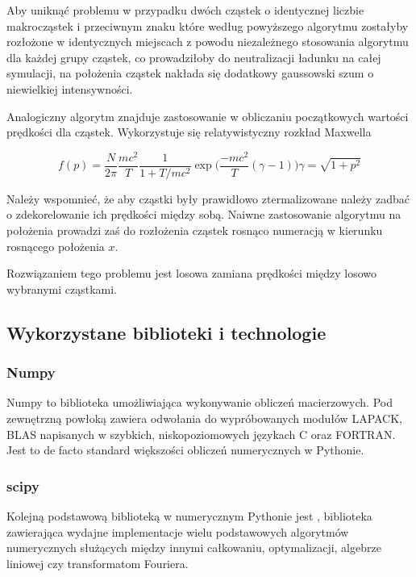     Aby uniknąć problemu w przypadku dwóch  cząstek o identycznej liczbie makrocząstek i przeciwnym znaku
    które według powyższego algorytmu zostałyby rozłożone w identycznych miejscach z powodu niezależnego
    stosowania algorytmu dla każdej grupy cząstek, co prowadziłoby do neutralizacji ładunku na całej symulacji,
    na położenia cząstek nakłada się dodatkowy gaussowski szum o niewielkiej intensywności.

    Analogiczny algorytm znajduje zastosowanie w obliczaniu początkowych wartości prędkości dla cząstek.
    Wykorzystuje się relatywistyczny rozkład Maxwella

    \begin{equation}
        f(p) = \frac{N}{2 \pi} \frac{mc^2}{T} \frac{1}{1+T/mc^2} \exp \Big (\frac{-mc^2}{T}(\gamma -1))

        \gamma = \sqrt{1+p^2}
        \label{relativistic-maxwell-distribution}
    \end{equation}

    Należy wspomnieć, że aby cząstki były prawidłowo ztermalizowane %
    należy zadbać o zdekorelowanie ich prędkości między sobą. Naiwne zastosowanie algorytmu na położenia
    prowadzi zaś do rozłożenia cząstek rosnąco numeracją w kierunku rosnącego położenia $x$.

    Rozwiązaniem tego problemu jest losowa zamiana prędkości między losowo wybranymi cząstkami.

    \subsection{Wykorzystane biblioteki i technologie}

    \subsubsection{Numpy}
    Numpy to biblioteka umożliwiająca wykonywanie obliczeń macierzowych. Pod zewnętrzną powłoką zawiera odwołania do
    wypróbowanych modułów LAPACK, BLAS %
    napisanych w szybkich, niskopoziomowych językach C oraz FORTRAN. Jest to de facto standard większości obliczeń
    numerycznych w Pythonie.

    \subsubsection{scipy}
    Kolejną podstawową biblioteką w numerycznym Pythonie jest , biblioteka
    zawierająca wydajne implementacje wielu podstawowych algorytmów numerycznych służących
    między innymi całkowaniu, optymalizacji, algebrze liniowej czy transformatom Fouriera.


